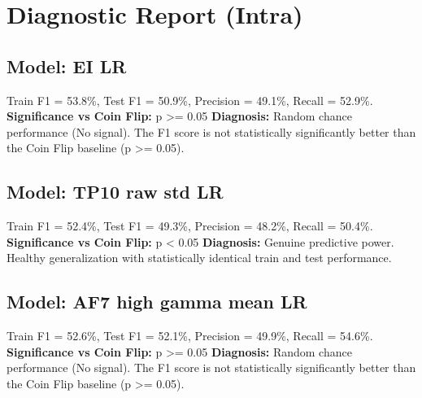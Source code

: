 \section*{Diagnostic Report (Intra)}
\subsection*{Model: EI LR}
Train F1 = 53.8\%, Test F1 = 50.9\%, Precision = 49.1\%, Recall = 52.9\%.
\newline
\textbf{Significance vs Coin Flip:} p >= 0.05
\newline
\textbf{Diagnosis:} Random chance performance (No signal). The F1 score is not statistically significantly better than the Coin Flip baseline (p >= 0.05).

\subsection*{Model: TP10 raw std LR}
Train F1 = 52.4\%, Test F1 = 49.3\%, Precision = 48.2\%, Recall = 50.4\%.
\newline
\textbf{Significance vs Coin Flip:} p < 0.05
\newline
\textbf{Diagnosis:} Genuine predictive power. Healthy generalization with statistically identical train and test performance.

\subsection*{Model: AF7 high gamma mean LR}
Train F1 = 52.6\%, Test F1 = 52.1\%, Precision = 49.9\%, Recall = 54.6\%.
\newline
\textbf{Significance vs Coin Flip:} p >= 0.05
\newline
\textbf{Diagnosis:} Random chance performance (No signal). The F1 score is not statistically significantly better than the Coin Flip baseline (p >= 0.05).
